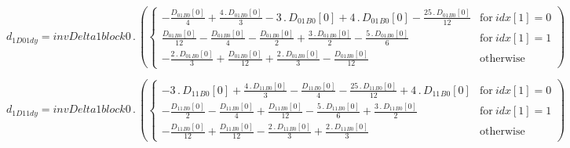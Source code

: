 \documentclass{article}
\begin{document}
\begin{dmath}d_{1 D01 dy} = invDelta1block0 \,.\, \left(\begin{cases} - \frac{{D_{01}{_{B0}}}[{0}]}{4} + \frac{4 \,.\, {D_{01}{_{B0}}}[{0}]}{3} - 3 \,.\, {D_{01}{_{B0}}}[{0}] + 4 \,.\, {D_{01}{_{B0}}}[{0}] - \frac{25 \,.\, {D_{01}{_{B0}}}[{0}]}{12} & 
\text{for}\: {idx}[{1}] = 0 \\\frac{{D_{01}{_{B0}}}[{0}]}{12} - \frac{{D_{01}{_{B0}}}[{0}]}{4} - \frac{{D_{01}{_{B0}}}[{0}]}{2} + \frac{3 \,.\, {D_{01}{_{B0}}}[{0}]}{2} - \frac{5 \,.\, {D_{01}{_{B0}}}[{0}]}{6} & \text{for}\: {idx}[{1}] = 1 \\- 
\frac{2 \,.\, {D_{01}{_{B0}}}[{0}]}{3} + \frac{{D_{01}{_{B0}}}[{0}]}{12} + \frac{2 \,.\, {D_{01}{_{B0}}}[{0}]}{3} - \frac{{D_{01}{_{B0}}}[{0}]}{12} & \text{otherwise} \end{cases}\right)\end{dmath}

\begin{dmath}d_{1 D11 dy} = invDelta1block0 \,.\, \left(\begin{cases} - 3 \,.\, {D_{11}{_{B0}}}[{0}] + \frac{4 \,.\, {D_{11}{_{B0}}}[{0}]}{3} - \frac{{D_{11}{_{B0}}}[{0}]}{4} - \frac{25 \,.\, {D_{11}{_{B0}}}[{0}]}{12} + 4 \,.\, {D_{11}{_{B0}}}[{0}] & 
\text{for}\: {idx}[{1}] = 0 \\- \frac{{D_{11}{_{B0}}}[{0}]}{2} - \frac{{D_{11}{_{B0}}}[{0}]}{4} + \frac{{D_{11}{_{B0}}}[{0}]}{12} - \frac{5 \,.\, {D_{11}{_{B0}}}[{0}]}{6} + \frac{3 \,.\, {D_{11}{_{B0}}}[{0}]}{2} & \text{for}\: {idx}[{1}] = 1 \\- 
\frac{{D_{11}{_{B0}}}[{0}]}{12} + \frac{{D_{11}{_{B0}}}[{0}]}{12} - \frac{2 \,.\, {D_{11}{_{B0}}}[{0}]}{3} + \frac{2 \,.\, {D_{11}{_{B0}}}[{0}]}{3} & \text{otherwise} \end{cases}\right)\end{dmath}
\end{document}
